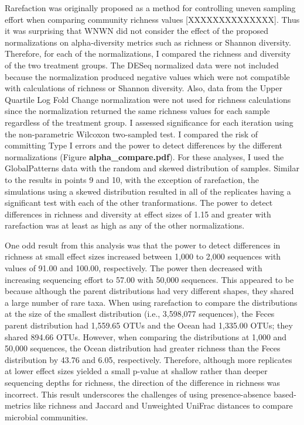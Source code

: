\documentclass[
]{article}
\begin{document}
Rarefaction was originally proposed as a method for controlling uneven
sampling effort when comparing community richness values
{[}XXXXXXXXXXXXXX{]}. Thus it was surprising that WNWN did not consider
the effect of the proposed normalizations on alpha-diversity metrics
such as richness or Shannon diversity. Therefore, for each of the
normalizations, I compared the richness and diversity of the two
treatment groups. The DESeq normalized data were not included because
the normalization produced negative values which were not compatible
with calculations of richness or Shannon diversity. Also, data from the
Upper Quartile Log Fold Change normalization were not used for richness
calculations since the normalization returned the same richness values
for each sample regardless of the treatment group. I assessed
significance for each iteration using the non-parametric Wilcoxon
two-sampled test. I compared the risk of committing Type I errors and
the power to detect differences by the different normalizations (Figure
\textbf{alpha\_compare.pdf}). For these analyses, I used the
GlobalPatterns data with the random and skewed distribution of samples.
Similar to the results in points 9 and 10, with the exception of
rarefaction, the simulations using a skewed distribution resulted in all
of the replicates having a significant test with each of the other
tranformations. The power to detect differences in richness and
diversity at effect sizes of 1.15 and greater with rarefaction was at
least as high as any of the other normalizations.

One odd result from this analysis was that the power to detect
differences in richness at small effect sizes increased between 1,000 to
2,000 sequences with values of 91.00 and 100.00, respectively. The power
then decreased with increasing sequencing effort to 57.00 with 50,000
sequences. This appeared to be because although the parent distributions
had very different shapes, they shared a large number of rare taxa. When
using rarefaction to compare the distributions at the size of the
smallest distribution (i.e., 3,598,077 sequences), the Feces parent
distribution had 1,559.65 OTUs and the Ocean had 1,335.00 OTUs; they
shared 894.66 OTUs. However, when comparing the distributions at 1,000
and 50,000 sequences, the Ocean distribution had greater richness than
the Feces distribution by 43.76 and 6.05, respectively. Therefore,
although more replicates at lower effect sizes yielded a small p-value
at shallow rather than deeper sequencing depths for richness, the
direction of the difference in richness was incorrect. This result
underscores the challenges of using presence-absence based-metrics like
richness and Jaccard and Unweighted UniFrac distances to compare
microbial communities.
\end{document}
